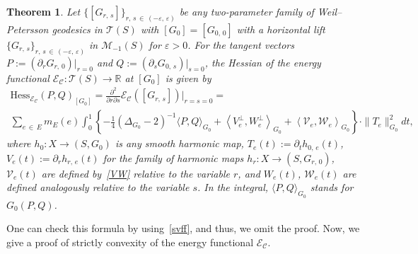 \documentclass[11pt]{article}
\newtheorem{theo}{Theorem}[section]
\theoremstyle{definition}
\newcommand{\Mc}{\mathcal{M}}
\numberwithin{equation}{section}
\newcommand{\e}{\varepsilon}
\newcommand{\p}{\psi}
\newcommand{\Cc}{\mathcal{C}}
\renewcommand{\Mc}{\mathcal{M}}
\newcommand{\Ec}{\mathcal{E}}
\newcommand{\Tc}{\mathcal{T}}
\newcommand*\Vc{\mathcal{V}}
\newcommand{\Wc}{\mathcal{W}}
\newcommand{\R}{\mathbb{R}}
\newcommand*\Hess{\mathrm{Hess}}
\renewcommand*\p{\partial}
\begin{document}
\begin{theo}\label{Thm:Hessian}
Let $\{[G_{r,\,s}]\}_{r,\,s\,\in\,(-\e,\,\e)}$ be any two-parameter family of Weil--Petersson geodesics in $\Tc(S)$ with $[G_0]=[G_{0,\,0}]$ with a horizontal lift $\{G_{r,\,s}\}_{r,\,s\,\in\,(-\e,\,\e)}$ in $\Mc_{-1}(S)$ for $\e>0$. For the tangent vectors $P:=(\p_r G_{r,\,0})|_{r=0}$ and $Q:=(\p_s G_{0,\,s})|_{s=0}$, the Hessian of the energy functional $\Ec_{\Cc}: \Tc(S)\to \R$ at $[G_0]$ is given by
\begin{multline*}
\Hess_{\Ec_\Cc}\left(P,Q\right)_{[G_0]}=\frac{\p^2}{\p r\p s}\Ec_{\Cc}\left([G_{r,\,s}]\right)\Big|_{r=s=0}=\\
\sum_{e\,\in\,E}m_E(e)\int_0^1\left\{-\frac{1}{4}\left(\Delta_{G_0}-2\right)^{-1}\langle P, Q\rangle_{G_0} +\left\langle V_e^{\perp}, W_e^{\perp}\right\rangle_{G_0}+\left\langle \Vc_e, \Wc_e\right\rangle_{G_0}\right\}\cdot \|T_e\|^2_{G_0}dt,
\end{multline*}
where $h_{0}:X \to (S, G_{0})$ is any smooth harmonic map, $T_e(t):=\p_th_{0,\,e}(t)$, $V_e(t):=\p_r h_{r,\,e}(t)$ for the family of harmonic maps $h_r: X\to (S, G_{r,\,0})$, $\Vc_e(t)$ are defined by~\eqref{VW} relative to the variable $r$, and $W_e(t)$, $\Wc_e(t)$ are defined analogously relative to the variable $s$. In the integral, $\langle P, Q\rangle_{G_0}$ stands for $G_0(P, Q)$.
\end{theo}

One can check this formula by using~\eqref{svff}, and thus, we omit the proof. Now, we give a proof of strictly convexity of the energy functional $\Ec_{\Cc}$.
\end{document}
